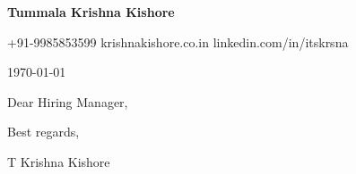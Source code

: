 \documentclass[11pt,a4paper]{article}
\begin{document}
{\LARGE\bfseries\color{VividPurple} Tummala Krishna Kishore}\par\vspace{2pt}
{\small \ifdefined\privateemail\privateemail{} \textbullet{} \fi +91-9985853599 \textbullet{} krishnakishore.co.in \textbullet{} linkedin.com/in/itskrsna}

\vspace{1.2em}
\today

Dear Hiring Manager,


Best regards,\par\nopagebreak
T Krishna Kishore
\end{document}
